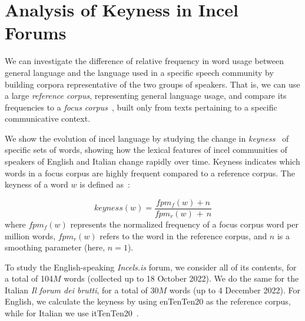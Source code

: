 \documentclass[11pt]{article}
\newcommand{\todoA}[1]{\todo[color=blue!40]{A: #1}}
\begin{document}



\appendix

\section{Analysis of Keyness in Incel Forums}
\label{app:keyness}

We can investigate the difference of relative frequency in word usage between general language and the language used in a specific speech community by building corpora representative of the two groups of speakers. That is, we can use a large \textit{reference corpus},
representing general language usage, and compare its frequencies to a \textit{focus corpus}~\cite{kilgarriff2009simple}, built only from texts pertaining to a specific communicative context.

We show the evolution of incel language by studying the change in 
\textit{keyness}~\cite{kilgarriff2009simple} 
of specific sets of words, showing how the lexical features of incel 
communities of speakers of English and Italian
change rapidly over time.
Keyness indicates which words in a focus corpus are highly frequent compared to a reference corpus. 
The keyness of a word $w$ is defined as~\cite{lexical_computing_2015}:%

\begin{equation}
keyness(w) = \frac{fpm_f(w) + n}
                {fpm_r(w)\, + \,n}
\end{equation}
%
where $fpm_f(w)$ represents the normalized frequency of a focus corpus word per million words, $fpm_r(w)$ refers to the word in the reference corpus, and $n$ is a smoothing parameter (here, $n=1$).


To study the English-speaking \textit{Incels.is} forum, we consider all of its contents, for a total of
104$M$ words (collected up to 18 October 2022).
We do the same for the
Italian \textit{Il forum dei brutti},
for a total of
30$M$ words (up to 4 December 2022). For English, we calculate the keyness by using 
enTenTen20
as the reference corpus, while for Italian we use itTenTen20~\cite{tenten2013kilgarriff}.
\end{document}
